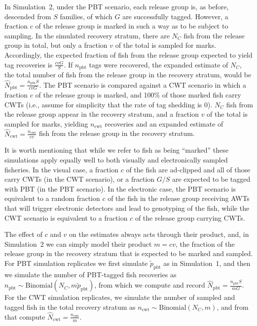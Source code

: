 \documentclass[11pt]{article}
\begin{document}
In Simulation~2, under the PBT scenario, each release group is, as before, descended from $S$ families, of which $G$ are successfully tagged.  However, a fraction
$c$ of the release group is marked in such a way as to be subject to sampling.  In the simulated recovery stratum, there are $N_C$ fish from
the release group in total, but only a fraction $v$ of the total is sampled for marks.  Accordingly, the expected fraction of fish 
from the release group expected to yield tag recoveries is $\frac{cvG}{S}$.   If $n_\mathrm{pbt}$ tags were recovered,
the expanded estimate of $N_C$, the
total number of fish from the release group in the recovery stratum, would be $\hat{N}_\mathrm{pbt} = \frac{n_\mathrm{pbt}S}{cvG}$.
The PBT scenario is compared against a CWT scenario in which a fraction $c$ of the release group is marked, and 100\% of those marked fish
carry CWTs (i.e., assume for simplicity that the rate of tag shedding is 0).  $N_C$ fish from the release group appear in the recovery stratum,
and a fraction $v$ of the total is sampled for marks, yielding $n_\mathrm{cwt}$ recoveries and an expanded estimate of
$\hat{N}_\mathrm{cwt} = \frac{n_\mathrm{cwt}}{cv}$ fish from the release group in the recovery stratum.  


It is worth mentioning that while we refer to fish as being ``marked'' these simulations apply equally well to both visually
and electronically sampled fisheries.  In the visual case, a fraction $c$ of the fish are ad-clipped and all of those
carry CWTs (in the CWT scenario), or a fraction $G/S$ are expected to be tagged with PBT (in the PBT scenario).  
In the electronic case, the PBT scenario is 
equivalent to a random fraction $c$ of the fish in the release group receiving AWTs that will trigger electronic detectors
and lead to genotyping of the fish, while the CWT scenario is equivalent to a fraction $c$ of the release group
carrying CWTs.   


The effect of $c$ and $v$ on the estimates always acts through their product, and, in Simulation~2 we can
simply model their product $m = cv$, the fraction of the release group in the recovery stratum that is expected to be marked and sampled.
For PBT simulation replicates we first simulate $\tilde{p}_\mathrm{pbt}$ as in Simulation~1, and then we
simulate the number of PBT-tagged fish recoveries as $n_\mathrm{pbt}\sim\mathrm{Binomial}(N_C, m \tilde{p}_\mathrm{pbt})$, from which 
we compute and record $\hat{N}_\mathrm{pbt} = \frac{n_\mathrm{pbt}S}{mG}$.  For the CWT simulation replicates, we simulate the number of sampled
and tagged fish in the total recovery stratum as $n_\mathrm{cwt} \sim \mathrm{Binomial}(N_C, m)$, and from that compute
$\hat{N}_\mathrm{cwt} = \frac{n_\mathrm{cwt}}{m}$.
 
\end{document}
